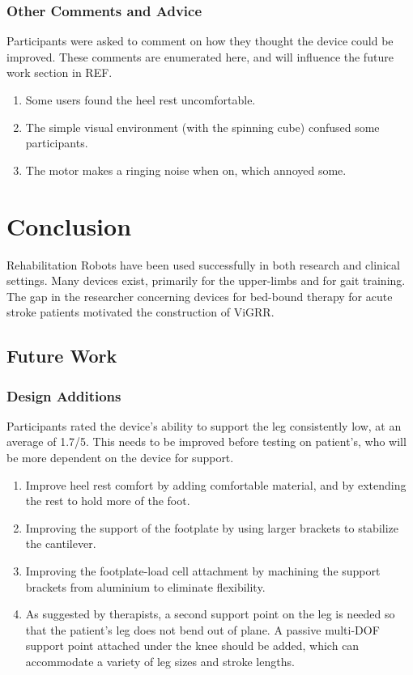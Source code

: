 \documentclass[12pt]{report}
\begin{document}
		\subsection{Other Comments and Advice}

Participants were asked to comment on how they thought the device could be improved. These comments are enumerated here, and will influence the future work section in REF. 		
		
		\begin{enumerate}
			\item Some users found the heel rest uncomfortable. 
			\item The simple visual environment (with the spinning cube) confused some participants.
			\item The motor makes a ringing noise when on, which annoyed some.
		
		\end{enumerate}
		
	
	
\chapter{Conclusion}

	Rehabilitation Robots have been used successfully in both research and clinical settings. Many devices exist, primarily for the upper-limbs and for gait training. The gap in the researcher concerning devices for bed-bound therapy for acute stroke patients motivated the construction of ViGRR. 

	\section{Future Work}
	
	\subsection{Design Additions}
	
	Participants rated the device's ability to support the leg consistently low, at an average of 1.7/5. This needs to be improved before testing on patient's, who will be more dependent on the device for support. 
	
	\begin{enumerate}
		\item Improve heel rest comfort by adding comfortable material, and by extending the rest to hold more of the foot. 
		\item Improving the support of the footplate by using larger brackets to stabilize the cantilever. 
		\item Improving the footplate-load cell attachment by machining the support brackets from aluminium to eliminate flexibility. 
		\item As suggested by therapists, a second support point on the leg is needed so that the patient's leg does not bend out of plane. A passive multi-DOF support point attached under the knee should be added, which can accommodate a variety of leg sizes and stroke lengths. 
	\end{enumerate}		
	
\end{document}
